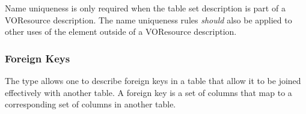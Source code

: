 \documentclass[11pt,a4paper]{ivoa}
\begin{document}
Name uniqueness is only required when the table set description is
part of a VOResource description.  The name uniqueness rules
\emph{should} also be applied to other uses of the
 element outside of a VOResource
description.  


\subsubsection{Foreign Keys}
\label{sect:fkey}


The  type allows one to describe foreign
keys in a table that allow it to be joined effectively with another
table.  A foreign key is a set of columns that map to a corresponding
set of columns in another table.  


\end{document}
